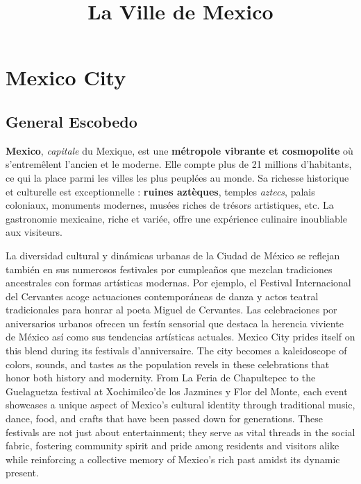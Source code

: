 \documentclass[12pt, a4paper]{article}
\title{La Ville de Mexico}
\author{}
\date{}
\begin{document}
   \maketitle

\section*{Mexico City}

\subsection{General Escobedo}

\textbf{Mexico}, \textit{capitale} du Mexique, est une \textbf{métropole vibrante et cosmopolite} où s'entremêlent l'ancien et le moderne. Elle compte plus de 21 millions d'habitants, ce qui la place parmi les villes les plus peuplées au monde. Sa richesse historique et culturelle est exceptionnelle : \textbf{ruines aztèques}, temples \textit{aztecs}, palais coloniaux, monuments modernes, musées riches de trésors artistiques, etc. La gastronomie mexicaine, riche et variée, offre une expérience culinaire inoubliable aux visiteurs.





La diversidad cultural y dinámicas urbanas de la Ciudad de México se reflejan también en sus numerosos festivales por cumpleaños que mezclan tradiciones ancestrales con formas artísticas modernas. Por ejemplo, el Festival Internacional del Cervantes acoge actuaciones contemporáneas de danza y actos teatral tradicionales para honrar al poeta Miguel de Cervantes. Las celebraciones por aniversarios urbanos ofrecen un festín sensorial que destaca la herencia viviente de México así como sus tendencias artísticas actuales.
Mexico City prides itself on this blend during its festivals d’anniversaire. The city becomes a kaleidoscope of colors, sounds, and tastes as the population revels in these celebrations that honor both history and modernity. From La Feria de Chapultepec to the Guelaguetza festival at Xochimilco'de los Jazmines y Flor del Monte, each event showcases a unique aspect of Mexico’s cultural identity through traditional music, dance, food, and crafts that have been passed down for generations. These festivals are not just about entertainment; they serve as vital threads in the social fabric, fostering community spirit and pride among residents and visitors alike while reinforcing a collective memory of Mexico’s rich past amidst its dynamic present.
\end{document}
